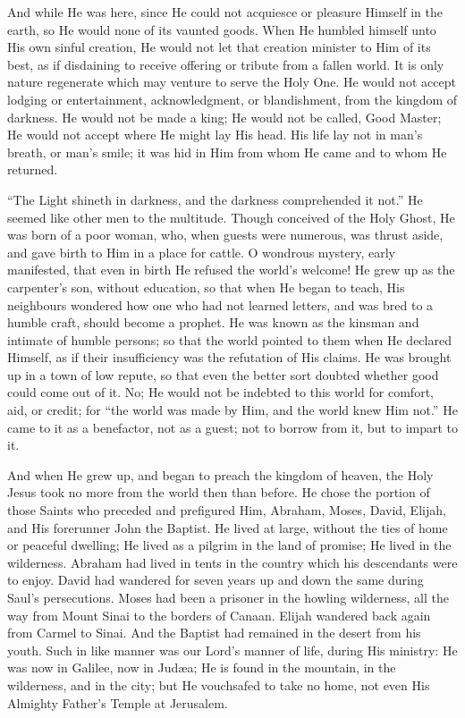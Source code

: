 And while He was here, since He could not acquiesce or pleasure
Himself in the earth, so He would none of its vaunted goods. When He
humbled himself unto His own sinful creation, He would not let that
creation minister to Him of its best, as if disdaining to receive
offering or tribute from a fallen world. It is only nature regenerate
which may venture to serve the Holy One. He would not accept lodging
or entertainment, acknowledgment, or blandishment, from the kingdom of
darkness. He would not be made a king; He would not be called, Good
Master; He would not accept where He might lay His head. His life lay
not in man's breath, or man's smile; it was hid in Him from whom He
came and to whom He returned.

``The Light shineth in darkness, and the darkness comprehended
it not.'' He seemed like other men to the multitude. Though
conceived of the Holy Ghost, He was born of a poor woman, who, when
guests were numerous, was thrust aside, and gave birth to Him in a
place for cattle. O wondrous mystery, early manifested, that even in
birth He refused the world's welcome! He grew up as the carpenter's
son, without education, so that when He began to teach, His neighbours
wondered how one who had not learned letters, and was bred to a humble
craft, should become a prophet. He was known as the kinsman and
intimate of humble persons; so that the world pointed to them when He
declared Himself, as if their insufficiency was the refutation of His
claims. He was brought up in a town of low repute, so that even the
better sort doubted whether good could come out of it. No; He would
not be indebted to this world for comfort, aid, or credit; for
``the world was made by Him, and the world knew Him not.'' He
came to it as a benefactor, not as a guest; not to borrow from it, but
to impart to it.

And when He grew up, and began to preach the kingdom of heaven, the
Holy Jesus took no more from the world then than before. He chose the
portion of those Saints who preceded and prefigured Him, Abraham,
Moses, David, Elijah, and His forerunner John the Baptist. He lived at
large, without the ties of home or peaceful dwelling; He lived as a
pilgrim in the land of promise; He lived in the wilderness. Abraham
had lived in tents in the country which his descendants were to enjoy.
David had wandered for seven years up and down the same during Saul's
persecutions. Moses had been a prisoner in the howling wilderness, all
the way from Mount Sinai to the borders of Canaan. Elijah wandered
back again from Carmel to Sinai. And the Baptist had remained in the
desert from his youth. Such in like manner was our Lord's manner of
life, during His ministry: He was now in Galilee, now in Judæa; He is
found in the mountain, in the wilderness, and in the city; but He
vouchsafed to take no home, not even His Almighty Father's Temple at
Jerusalem.

